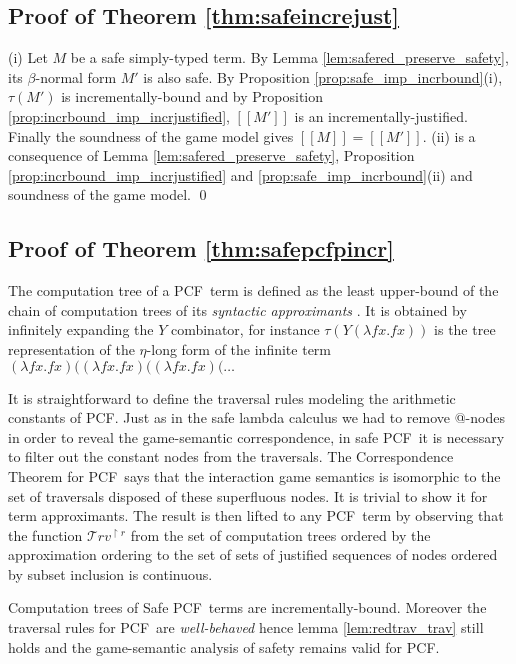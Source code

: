 \documentclass{llncs}
\newcommand\travset{\mathcal{T}rv}
\newcommand{\sem}[1]{{[\![ #1 ]\!]}}
\newcommand\pcf{\textsf{PCF}}
\begin{document}
\subsection{Proof of Theorem \ref{thm:safeincrejust}}
(i) Let $M$ be a safe simply-typed term. By Lemma
\ref{lem:safered_preserve_safety}, its $\beta$-normal form $M'$ is
also safe. By Proposition \ref{prop:safe_imp_incrbound}(i), $\tau(M')$
is incrementally-bound and by Proposition
\ref{prop:incrbound_imp_incrjustified}, $\sem{M'}$ is an
incrementally-justified. Finally the soundness of the game model gives
$\sem{M} = \sem{M'}$.  (ii) is a consequence of Lemma
\ref{lem:safered_preserve_safety}, Proposition
\ref{prop:incrbound_imp_incrjustified} and
\ref{prop:safe_imp_incrbound}(ii) and soundness of the game model.
\qed

\subsection{Proof of Theorem \ref{thm:safepcfpincr}}

The computation tree of a \pcf\ term is defined as the least
upper-bound of the chain of computation trees of its \emph{syntactic approximants} \cite{abramsky:game-semantics-tutorial}.  It is
obtained by infinitely expanding the $Y$ combinator,
for instance $\tau(Y (\lambda f x. f x))$ is the tree representation
of the $\eta$-long form of the infinite term $(\lambda f x. f x)
 ((\lambda f x. f x) ((\lambda f x. f x) ( \ldots$


It is straightforward to define the traversal rules modeling the
arithmetic constants of \pcf. Just as in the safe lambda calculus
we had to remove @-nodes in order to reveal the game-semantic
correspondence, in safe \pcf\ it is necessary to filter out the
constant nodes from the traversals. The Correspondence Theorem for
\pcf\ says that the interaction game semantics is isomorphic to the
set of traversals disposed of these superfluous nodes. It is
trivial to show it for term approximants. The result is then
lifted to any \pcf\ term by observing that the function
$\travset^{\upharpoonright r}$ from the set of computation trees ordered by the approximation ordering to the set of sets of justified sequences of nodes ordered by subset inclusion is continuous.

Computation trees of Safe \pcf\ terms are incrementally-bound.
Moreover the traversal rules for \pcf\ are \emph{well-behaved} hence
lemma \ref{lem:redtrav_trav} still holds and the game-semantic
analysis of safety remains valid for \pcf.
\end{document}

